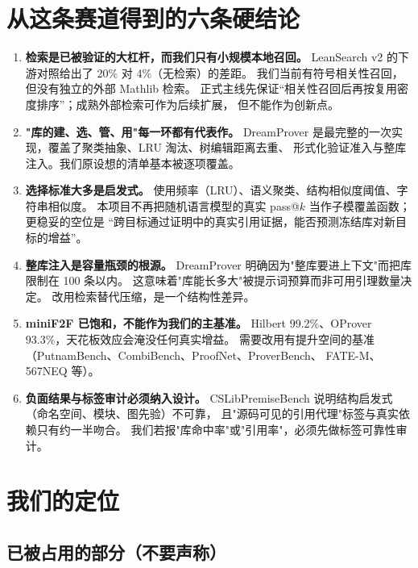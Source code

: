 \documentclass[UTF8,a4paper,11pt,fontset=windows]{ctexart}
\begin{document}
\section{从这条赛道得到的六条硬结论}

\begin{enumerate}[leftmargin=1.6em,itemsep=4pt]
  \item \textbf{检索是已被验证的大杠杆，而我们只有小规模本地召回。}
        LeanSearch v2 的下游对照给出了 20\% 对 4\%（无检索）的差距。
        我们当前有符号相关性召回，但没有独立的外部 Mathlib 检索。
        正式主线先保证“相关性召回后再按复用密度排序”；成熟外部检索可作为后续扩展，
        但不能作为创新点。
  \item \textbf{"库的建、选、管、用"每一环都有代表作。}
        DreamProver 是最完整的一次实现，覆盖了聚类抽象、LRU 淘汰、树编辑距离去重、
        形式化验证准入与整库注入。我们原设想的清单基本被逐项覆盖。
  \item \textbf{选择标准大多是启发式。}
        使用频率（LRU）、语义聚类、结构相似度阈值、字符串相似度。
        本项目不再把随机语言模型的真实 pass@$k$ 当作子模覆盖函数；更稳妥的空位是
        “跨目标通过证明中的真实引用证据，能否预测冻结库对新目标的增益”。
  \item \textbf{整库注入是容量瓶颈的根源。}
        DreamProver 明确因为"整库要进上下文"而把库限制在 100 条以内。
        这意味着"库能长多大"被提示词预算而非可用引理数量决定。
        改用检索替代压缩，是一个结构性差异。
  \item \textbf{miniF2F 已饱和，不能作为我们的主基准。}
        Hilbert 99.2\%、OProver 93.3\%，天花板效应会淹没任何真实增益。
        需要改用有提升空间的基准（PutnamBench、CombiBench、ProofNet、ProverBench、
        FATE-M、567NEQ 等）。
  \item \textbf{负面结果与标签审计必须纳入设计。}
        CSLibPremiseBench 说明结构启发式（命名空间、模块、图先验）不可靠，
        且"源码可见的引用代理"标签与真实依赖只有约一半吻合。
        我们若报"库命中率"或"引用率"，必须先做标签可靠性审计。
\end{enumerate}

\section{我们的定位}

\subsection{已被占用的部分（不要声称）}
\end{document}
